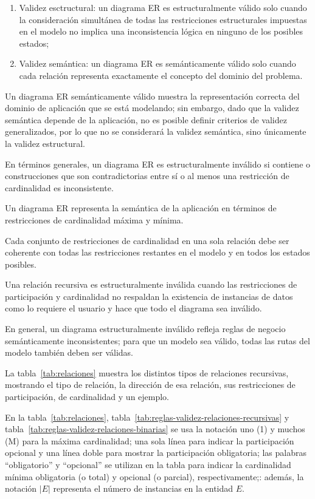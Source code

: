 \begin{enumerate}
    \item Validez esctructural: un diagrama ER es estructuralmente válido solo cuando la consideración simultánea de todas las restricciones estructurales impuestas en el modelo no implica una inconsistencia lógica en ninguno de los posibles estados; 
    \item Validez semántica: un diagrama ER es semánticamente válido solo cuando cada relación representa exactamente el concepto del dominio del problema. 
\end{enumerate}


 Un diagrama ER semánticamente válido muestra la representación correcta del dominio de aplicación que se está modelando; sin embargo, dado que la validez semántica depende de la aplicación, no es posible definir criterios de validez generalizados, por lo que no se considerará la validez semántica, sino únicamente la validez estructural.


En términos generales, un diagrama ER es estructuralmente inválido si contiene o construcciones que son contradictorias entre sí o al menos una restricción de cardinalidad es inconsistente.


Un diagrama ER representa la semántica de la aplicación en términos de restricciones de cardinalidad máxima y mínima. 


Cada conjunto de restricciones de cardinalidad en una sola relación debe ser coherente con todas las restricciones restantes en el modelo y en todos los estados posibles.


Una relación recursiva es estructuralmente inválida cuando las restricciones de participación y cardinalidad no respaldan la existencia de instancias de datos como lo requiere el usuario y hace que todo el diagrama sea inválido.


En general, un diagrama estructuralmente inválido refleja reglas de negocio semánticamente inconsistentes; para que un modelo sea válido, todas las rutas del modelo también deben ser válidas.


La tabla~\ref{tab:relaciones} muestra los distintos tipos de relaciones recursivas, mostrando el tipo de relación, la dirección de esa relación, sus restricciones de participación, de cardinalidad y un ejemplo.

En la tabla~\ref{tab:relaciones}, tabla~\ref{tab:reglas-validez-relaciones-recursivas} y tabla~\ref{tab:reglas-validez-relaciones-binarias} se usa la notación uno (1) y muchos (M) para la máxima cardinalidad; una sola línea para indicar la participación opcional y una línea doble para mostrar la participación obligatoria; las palabras ``obligatorio'' y ``opcional'' se utilizan en la tabla para indicar la cardinalidad mínima obligatoria (o total) y opcional (o parcial), respectivamente;: además, la notación $|E|$ representa el número de instancias en la entidad $E$.

